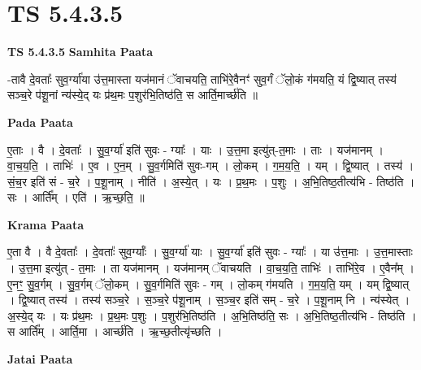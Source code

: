 \documentclass[17pt]{extarticle}
\begin{document}
\section{ TS 5.4.3.5 }

\textbf{TS 5.4.3.5 } \newline
\textbf{Samhita Paata} \newline

-तावै दे॒वताः᳚ सुव॒र्ग्या॑या उ॑त्त॒मास्ता यज॑मानं ॅवाचयति॒ ताभि॑रे॒वैनꣳ॑ सुव॒र्गं ॅलो॒कं ग॑मयति॒ यं द्वि॒ष्यात् तस्य॑ सञ्च॒रे प॑शू॒नां न्य॑स्ये॒द् यः प्र॑थ॒मः प॒शुर॑भि॒तिष्ठ॑ति॒ स आर्ति॒मार्च्छ॑ति ॥ \newline

\textbf{Pada Paata} \newline

ए॒ताः । वै । दे॒वताः᳚ । सु॒व॒र्ग्या॑ इति॑ सुवः - ग्याः᳚ । याः । उ॒त्त॒मा इत्यु॑त्-त॒माः । ताः । यज॑मानम् । वा॒च॒य॒ति॒ । ताभिः॑ । ए॒व । ए॒न॒म् । सु॒व॒र्गमिति॑ सुवः-गम् । लो॒कम् । ग॒म॒य॒ति॒ । यम् । द्वि॒ष्यात् । तस्य॑ । सं॒च॒र इति॑ सं - च॒रे । प॒शू॒नाम् । नीति॑ । अ॒स्ये॒त् । यः । प्र॒थ॒मः । प॒शुः । अ॒भि॒तिष्ठ॒तीत्य॑भि - तिष्ठ॑ति । सः । आर्ति᳚म् । एति॑ । ऋ॒च्छ॒ति॒ ॥  \newline


\textbf{Krama Paata} \newline

ए॒ता वै । वै दे॒वताः᳚ । दे॒वताः᳚ सुव॒र्ग्याः᳚ । सु॒व॒र्ग्या॑ याः । सु॒व॒र्ग्या॑ इति॑ सुवः - ग्याः᳚ । या उ॑त्त॒माः । उ॒त्त॒मास्ताः । उ॒त्त॒मा इत्यु॑त् - त॒माः । ता यज॑मानम् । यज॑मानम् ॅवाचयति । वा॒च॒य॒ति॒ ताभिः॑ । ताभि॑रे॒व । ए॒वैन᳚म् । ए॒नꣳ॒॒ सु॒व॒र्गम् । सु॒व॒र्गम् ॅलो॒कम् । सु॒व॒र्गमिति॑ सुवः - गम् । लो॒कम् ग॑मयति । ग॒म॒य॒ति॒ यम् । यम् द्वि॒ष्यात् । द्वि॒ष्यात् तस्य॑ । तस्य॑ सञ्च॒रे । स॒ञ्च॒रे प॑शू॒नाम् । स॒ञ्च॒र इति॑ सम् - च॒रे । प॒शू॒नाम् नि । न्य॑स्येत् । अ॒स्ये॒द् यः । यः प्र॑थ॒मः । प्र॒थ॒मः प॒शुः । प॒शुर॑भि॒तिष्ठ॑ति । अ॒भि॒तिष्ठ॑ति॒ सः । अ॒भि॒तिष्ठ॒तीत्य॑भि - तिष्ठ॑ति । स आर्ति᳚म् । आर्ति॒मा । आर्च्छ॑ति । ऋ॒च्छ॒तीत्यृ॑च्छति । \newline

\textbf{Jatai Paata} \newline
\end{document}
